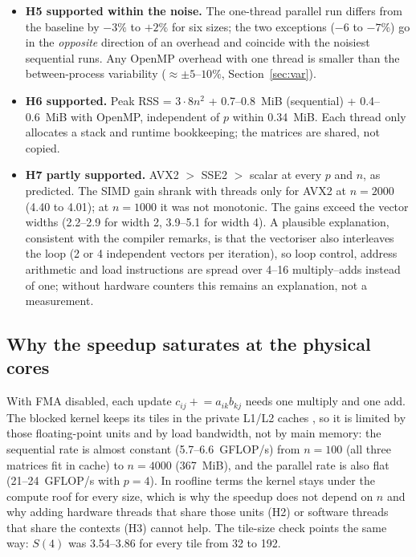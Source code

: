 \begin{itemize}
the same order as the whole sequential product at $n=16$ (1.47~$\mu$s), which explains why more threads are \emph{worse} there; at $n=32$ the
10~$\mu$s of work already amortise it. This conclusion is bound to the timing boundary: products were timed in batches after a warm-up; a
single cold call, which includes the creation of the threads, was not measured separately.
\item \textbf{H5 supported within the noise.} The one-thread parallel run differs from the baseline by $-3\%$ to $+2\%$ for six sizes; the two
exceptions ($-6$ to $-7\%$) go in the \emph{opposite} direction of an overhead and coincide with the noisiest sequential runs. Any OpenMP overhead
with one thread is smaller than the between-process variability ($\approx\pm5$--$10\%$, Section~\ref{sec:var}).
\item \textbf{H6 supported.} Peak RSS = $3\cdot8n^2$ + 0.7--0.8~MiB (sequential) + 0.4--0.6~MiB with OpenMP, independent of $p$ within 0.34~MiB.
Each thread only allocates a stack and runtime bookkeeping; the matrices are shared, not copied.
\item \textbf{H7 partly supported.} AVX2 $>$ SSE2 $>$ scalar at every $p$ and $n$, as predicted. The SIMD gain shrank with threads only for AVX2 at
$n=2000$ (4.40 to 4.01); at $n=1000$ it was not monotonic. The gains exceed the vector widths (2.2--2.9 for width 2, 3.9--5.1 for width 4). A
plausible explanation, consistent with the compiler remarks, is that the vectoriser also interleaves the loop (2 or 4 independent vectors per
iteration), so loop control, address arithmetic and load instructions are spread over 4--16 multiply--adds instead of one; without hardware
counters this remains an explanation, not a measurement.
\end{itemize}

\subsection{Why the speedup saturates at the physical cores}
With FMA disabled, each update $c_{ij}\mathrel{+}=a_{ik}b_{kj}$ needs one multiply and one add. The blocked kernel keeps its tiles in the
private L1/L2 caches \cite{lam,goto}, so it is limited by those floating-point units and by load bandwidth, not by main memory: the
sequential rate is almost constant (5.7--6.6~GFLOP/s) from $n=100$ (all three matrices fit in cache) to $n=4000$ (367~MiB), and the parallel rate is also flat
(21--24~GFLOP/s with $p=4$). In roofline terms \cite{roofline} the kernel stays under the compute roof for every size, which is why the speedup does
not depend on $n$ and why adding hardware threads that share those units (H2) or software threads that share the contexts (H3) cannot help.
The tile-size check points the same way: $S(4)$ was 3.54--3.86 for every tile from 32 to 192.

